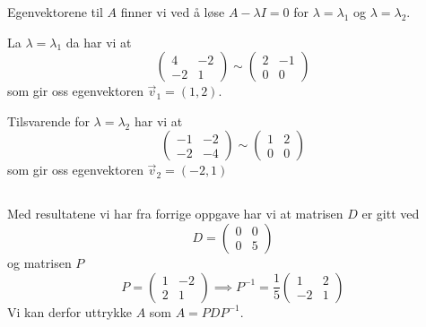 \documentclass[12pt, a4paper,norsk]{article}
\newcommand{\deloppgave}{\subsection{}}
\newcommand{\inverse}{^{-1}}
\begin{document}
	Egenvektorene til $A$ finner vi ved å løse $A - \lambda I = 0$ for $\lambda = \lambda_1$ og $\lambda = \lambda_2$.
	
	La $\lambda = \lambda_1$ da har vi at
	$$
	\begin{pmatrix}
		4 & -2\\
		-2 & 1
	\end{pmatrix} \sim
	\begin{pmatrix}
		2 & -1\\
		0 & 0
	\end{pmatrix}
	$$
	som gir oss egenvektoren $\vec{v}_1 = (1, 2)$. 
	
	Tilsvarende for $\lambda = \lambda_2$ har vi at
	$$
	\begin{pmatrix}
		-1 & -2\\
		-2 & -4
	\end{pmatrix}\sim
	\begin{pmatrix}
		1 & 2\\
		0 & 0
	\end{pmatrix}
	$$
	som gir oss egenvektoren $\vec{v}_2 = (-2, 1)$
	
	\deloppgave
	Med resultatene vi har fra forrige oppgave har vi at matrisen $D$ er gitt ved
	$$
	D = \begin{pmatrix}
		0 & 0\\
		0 & 5
	\end{pmatrix}
	$$
	og matrisen $P$
	$$
	P = \begin{pmatrix}
		1 & -2\\
		2 & 1
	\end{pmatrix}
	\implies
	P\inverse = \frac{1}{5}\begin{pmatrix}
		1 & 2\\
		-2 & 1
	\end{pmatrix}
	$$
	Vi kan derfor uttrykke $A$ som $A = PDP\inverse$.
	
\end{document}
